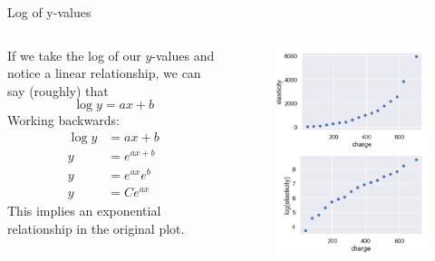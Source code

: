 \documentclass[aspectratio=169]{../latex_main/tntbeamer}  %
\begin{document}
	
	
	\begin{frame}{Log of y-values}
	    \begin{columns}
	        \begin{column}{.5\textwidth}
	                If we take the log of our $y$-values and notice a linear relationship, we can say (roughly) that
	                \begin{equation*}
	                    \log y = ax + b
	                \end{equation*}
	                Working backwards:
	                \begin{align*}
	                    \log y &= ax + b\\
	                    y &= e^{ax+b}\\
	                    y &= e^{ax}e^b\\
	                    y &= Ce^{ax}
	                \end{align*}
	                This implies an exponential relationship in the original plot.
	        \end{column}
	        
	        
	        \begin{column}{.5\textwidth}
	                \begin{figure}
	                    \includegraphics[scale=.3]{Bild96}
	                \end{figure}
	        \end{column}
	    \end{columns}
	\end{frame}
	
\end{document}
